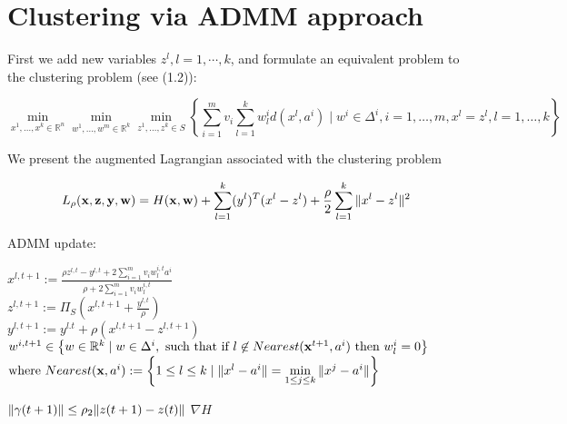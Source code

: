 \documentclass[11pt]{article}
\numberwithin{equation}{section}
\begin{document}
\newpage

\section{Clustering via ADMM approach }

First we add new variables $z^l, l=1, \cdots ,k$, and formulate an equivalent problem to the clustering problem (see (1.2)):

\begin{equation}
	\min\limits_{x^1, \dots ,x^k \in \mathbb{R}^n} \min\limits_{w^1, \dots ,w^m \in \mathbb{R}^k} \min\limits_{z^1, \dots ,z^k \in S} \left\lbrace \sum\limits_{i=1}^{m} v_i \sum\limits_{l=1}^{k} w^i_l d(x^l , a^i) \mid w^i \in \Delta^i , i=1, \dots ,m , x^l = z^l, l=1, \dots ,k \right\rbrace
\end{equation}

We present the augmented Lagrangian associated with the clustering problem

\begin{equation}
	L_\rho({\bf x},{\bf z},{\bf y},{\bf w}) = H({\bf x},{\bf w}) + \sum\limits_{l=1}^k (y^l)^T (x^l -z^l) + \frac{\rho}{2} \sum\limits_{l=1}^k \| x^l -z^l \|^2
\end{equation}

\noindent ADMM update:
\begin{center}
	$x^{l,t+1} := \frac{\rho z^{l,t} - y^{l,t} + 2\sum\limits_{i=1}^m {v_i w^{i,t}_l a^i} }{\rho + 2\sum\limits_{i=1}^m v_i w^{i,t}_l}$ \\ \bigskip
	$z^{l,t+1} := \Pi_S(x^{l,t+1} + \frac{y^{l,t}}{\rho} )$ \\ \bigskip
	$y^{l,t+1} := y^{l.t} + \rho (x^{l,t+1} - z^{l,t+1})$ \\ \bigskip
	$w^{i,t+1} \in \left\lbrace w \in \mathbb{R}^k \mid w \in \Delta^i,\text{ such that if }l \not\in Nearest({\bf x}^{t+1} ,a^i) \text{ then } w^i_l=0 \right\rbrace $
\smallskip
	$\text{where } Nearest({\bf x} ,a^i) := \left\lbrace 1 \leq l \leq k \mid \|x^l -a^i\|= \min\limits_{1 \leq j \leq k} \|x^j - a^i\| \right\rbrace$
\end{center}

\newpage

\noindent
$\|\gamma(t+1)\| \leq \rho_2\|z(t+1)-z(t)\| \\$
$\nabla H$


\end{document}
